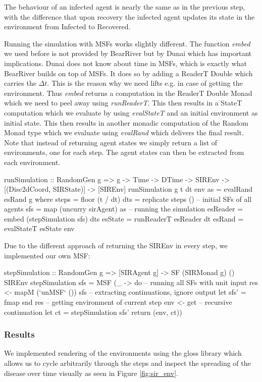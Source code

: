 The behaviour of an infected agent is nearly the same as in the previous step, with the difference that upon recovery the infected agent updates its state in the environment from Infected to Recovered.

Running the simulation with MSFs works slightly different. The function \textit{embed} we used before is not provided by BearRiver but by Dunai which has important implications. Dunai does not know about time in MSFs, which is exactly what BearRiver builds on top of MSFs. It does so by adding a ReaderT Double which carries the $\Delta t$. This is the reason why we need lifts e.g. in case of getting the environment. Thus \textit{embed} returns a computation in the ReaderT Double Monad which we need to peel away using \textit{runReaderT}. This then results in a StateT computation which we evaluate by using \textit{evalStateT} and an initial environment as initial state. This then results in another monadic computation of the Random Monad type which we evaluate using \textit{evalRand} which delivers the final result. Note that instead of returning agent states we simply return a list of environments, one for each step. The agent states can then be extracted from each environment.

\begin{HaskellCode}
runSimulation :: RandomGen g => g -> Time -> DTime 
  -> SIREnv -> [(Disc2dCoord, SIRState)] -> [SIREnv]
runSimulation g t dt env as = evalRand esRand g
  where
    steps    = floor (t / dt)
    dts      = replicate steps ()
    -- initial SFs of all agents
    sfs      = map (uncurry sirAgent) as   
    -- running the simulation   
    esReader = embed (stepSimulation sfs) dts 
    esState  = runReaderT esReader dt 
    esRand   = evalStateT esState env     
\end{HaskellCode}

Due to the different approach of returning the SIREnv in every step, we implemented our own MSF:
\begin{HaskellCode}
stepSimulation :: RandomGen g 
  => [SIRAgent g] -> SF (SIRMonad g) () SIREnv
stepSimulation sfs = MSF (\_ -> do
  -- running all SFs with unit input
  res <- mapM (`unMSF` ()) sfs
  -- extracting continuations, ignore output
  let sfs' = fmap snd res
  -- getting environment of current step   
  env <- get
  -- recursive continuation    
  let ct = stepSimulation sfs'  
  return (env, ct))
\end{HaskellCode}

\subsubsection{Results}
We implemented rendering of the environments using the gloss library which allows us to cycle arbitrarily through the steps and inspect the spreading of the disease over time visually as seen in Figure \ref{fig:sir_env}.


